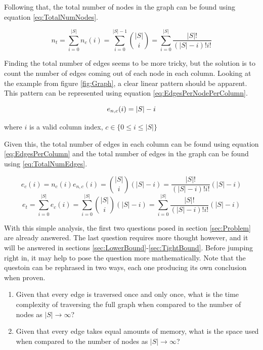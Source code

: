 \documentclass{article}
\begin{document}
Following that, the total number of nodes in the graph can be found using equation \ref{eq:TotalNumNodes}.

\begin{equation}
    n_t=\sum_{i=0}^{|S|}n_c(i)=\sum_{i=0}^{|S|-1}\binom{|S|}{i}=\sum_{i=0}^{|S|}\frac{|S|!}{(|S|-i)!i!}
    \label{eq:TotalNumNodes}
\end{equation}

Finding the total number of edges seems to be more tricky, but the solution is to count the number of edges coming out of each node in each column. Looking at the example from figure \ref{fig:Graph}, a clear linear pattern should be apparent. This pattern can be represented using equation \ref{eq:EdgesPerNodePerColumn}.

\begin{equation}
    e_{n,c}(i)=|S|-i\\
    \label{eq:EdgesPerNodePerColumn}
\end{equation}
\centerline{where $i$ is a valid column index, $c\in \{ 0\le i\le |S|\}$}

Given this, the total number of edges in each column can be found using equation \ref{eq:EdgesPerColumn} and the total number of edges in the graph can be found using \ref{eq:TotalNumEdges}.

\begin{equation}
    e_c(i)=n_c(i)e_{n,c}(i)=\binom{|S|}{i}\left(|S|-i\right)=
    \frac{|S|!}{(|S|-i)!i!}\left(|S|-i\right)
    \label{eq:EdgesPerColumn}
\end{equation}
\begin{equation}
    e_t=\sum_{i=0}^{|S|}e_c(i)=
    \sum_{i=0}^{|S|}\binom{|S|}{i}\left(|S|-i\right)=
    \sum_{i=0}^{|S|}\frac{|S|!}{(|S|-i)!i!}\left(|S|-i\right)
    \label{eq:TotalNumEdges}
\end{equation}

With this simple analysis, the first two questions posed in section \ref{sec:Problem} are already answered. The last question requires more thought however, and it will be answered in sections \ref{sec:LowerBound}-\ref{sec:TightBound}. Before jumping right in, it may help to pose the question more mathematically. Note that the questoin can be rephrased in two ways, each one producing its own conclusion when proven.

\begin{enumerate}
    \item Given that every edge is traversed once and only once, what is the time complexity of traversing the full graph when compared to the number of nodes as $|S|\to\infty$?
    \item Given that every edge takes equal amounts of memory, what is the space used when compared to the number of nodes as $|S|\to\infty$?
\end{enumerate}
\end{document}
